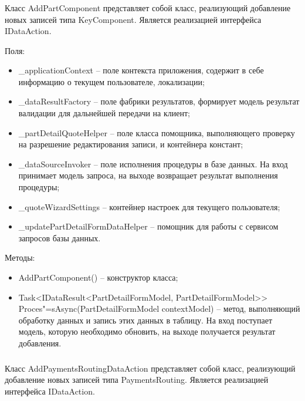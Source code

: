 \subsubsection{}
\label{sub:arch_and_mod:data_layer:add_part_component}

Класс AddPartComponent представляет собой класс, реализующий добавление новых записей типа KeyComponent. Является реализацией интерфейса IDataAction.

Поля:
\begin{itemize}
  \item \_applicationContext – поле контекста приложения, содержит в себе информацию о текущем пользователе, локализации;
  \item \_dataResultFactory – поле фабрики результатов, формирует модель результат валидации для дальнейшей передачи на клиент;
  \item \_partDetailQuoteHelper – поле класса помощника, выполняющего проверку на разрешение редактирования записи, и контейнера констант;
  \item \_dataSourceInvoker – поле исполнения процедуры в базе данных. На вход принимает модель запроса, на выходе возвращает результат выполнения процедуры;
  \item \_quoteWizardSettings – контейнер настроек для текущего пользователя;
  \item \_updatePartDetailFormDataHelper – помощник для работы с сервисом запросов базы данных.
\end{itemize}

Методы:
\begin{itemize}
  \item AddPartComponent() – конструктор класса;
  \item Task<IDataResult<PartDetailFormModel, PartDetailFormModel>> Proces"=sAsync(PartDetailFormModel contextModel) – метод, выполняющий обработку данных и запись этих данных в таблицу. На вход поступает модель, которую необходимо обновить, на выходе получается результат добавления.
\end{itemize}

\subsubsection{}
\label{sub:arch_and_mod:data_layer:add_payments_routing}

Класс AddPaymentsRoutingDataAction представляет собой класс, реализующий добавление новых записей типа PaymentsRouting. Является реализацией интерфейса IDataAction.

